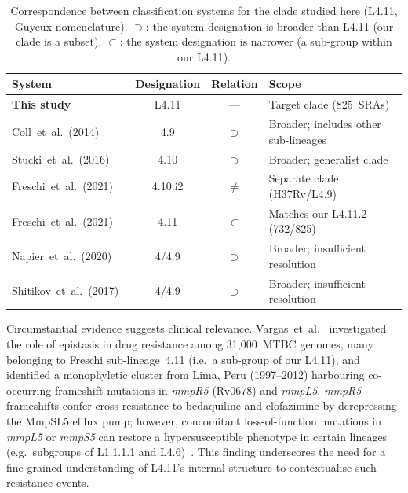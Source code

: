\documentclass[11pt,a4paper]{article}
\newcommand{\lignee}[1]{\textsf{#1}}
\begin{document}
\begin{table}[htbp!]
	\centering
	\small
	\caption{Correspondence between classification systems for
		the clade studied here (\lignee{L4.11}, Guyeux nomenclature).
		$\supset$: the system designation is broader than \lignee{L4.11}
		(our clade is a subset).
		$\subset$: the system designation is narrower
		(a sub-group within our \lignee{L4.11}).}
	\label{tab:nomenclature}
	\begin{tabular}{lccl}
		\toprule
		\textbf{System} & \textbf{Designation} & \textbf{Relation} & \textbf{Scope} \\
		\midrule
		\textbf{This study} & \lignee{L4.11} & --- & Target clade (825~SRAs) \\
		Coll~et~al.~(2014)~\cite{coll2014} & \lignee{4.9} & $\supset$ & Broader; includes other sub-lineages \\
		Stucki~et~al.~(2016)~\cite{stucki2016} & \lignee{4.10} & $\supset$ & Broader; generalist clade \\
		Freschi~et~al.~(2021)~\cite{freschi2021} & \lignee{4.10.i2} & $\neq$ & Separate clade (H37Rv/L4.9) \\
		Freschi~et~al.~(2021)~\cite{freschi2021} & \lignee{4.11} & $\subset$ & Matches our \lignee{L4.11.2} (732/825) \\
		Napier~et~al.~(2020)~\cite{napier2020} & \lignee{4/4.9} & $\supset$ & Broader; insufficient resolution \\
		Shitikov~et~al.~(2017)~\cite{shitikov2017} & \lignee{4/4.9} & $\supset$ & Broader; insufficient resolution \\
		\bottomrule
	\end{tabular}
\end{table}

Circumstantial evidence suggests clinical relevance.  Vargas~et~al.~\cite{vargas2023}
investigated the role of epistasis in drug resistance among 31,000~MTBC genomes,
many belonging to Freschi sub-lineage~4.11 (i.e.\ a sub-group of our
\lignee{L4.11}), and identified a monophyletic cluster from Lima, Peru
(1997--2012) harbouring co-occurring frameshift mutations in
\textit{mmpR5} (Rv0678) and \textit{mmpL5}.  \textit{mmpR5} frameshifts
confer cross-resistance to bedaquiline and clofazimine by derepressing the
MmpSL5 efflux pump; however, concomitant loss-of-function mutations in
\textit{mmpL5} or \textit{mmpS5} can restore a hypersusceptible phenotype
in certain lineages (e.g.\ subgroups of L1.1.1.1 and
L4.6)~\cite{merker2020}.  This finding underscores the need for a
fine-grained understanding of \lignee{L4.11}'s internal structure to
contextualise such resistance events.
\end{document}
